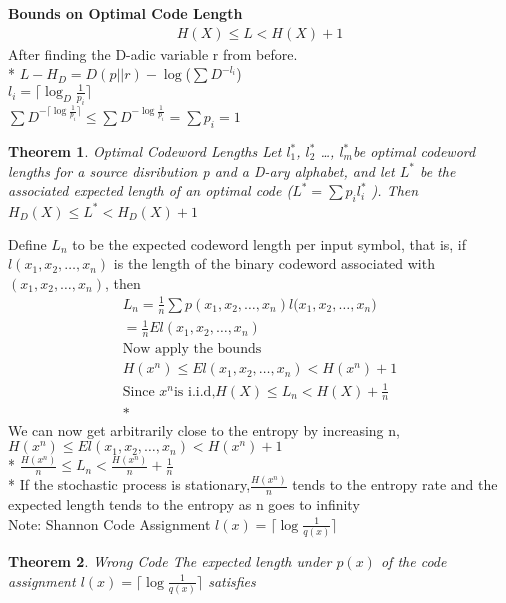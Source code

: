 \documentclass[10pt]{article}
\newtheorem{thm}{Theorem}[section]
\begin{document}
\begin{tiny}
\begin{multicols}{3}
\textbf{\scriptsize Bounds on Optimal Code Length}
\begin{eqnarray*}
H(X) \leq L < H(X) + 1
\end{eqnarray*}
After finding the D-adic variable r from before. \\*
$L-H_D = D(p||r) - \log $($\sum D^{-l_i}$) \\
${l_i} = \lceil{\log_D \frac {1}{p_i}} \rceil$ \\
$\sum D^{- \lceil \log \frac {1}{p_i}\rceil}\leq\sum D^{- \log\frac{1}{p_i}}=\sum {p_i}=1$ 
\begin{thm}{Optimal Codeword Lengths} \label{thm:optimum codewords}
Let ${l_1^{*}}$, ${l_2^{*}}$ \ldots , ${l_m^{*}}$be optimal codeword lengths for a
source disribution p and a D-ary alphabet, and let ${L^{*}}$ be the associated
expected length of an optimal code (${L^{*}}=\sum{p_i}{l_i^{*}}$ ). Then
${H_D(X)}\leq L^{*}<{H_D(X)}+1$ 
\end{thm}
Define ${L_n}$ to be the expected codeword length per input symbol, that is,
if ${l(x_1,x_2, \ldots ,x_n)}$ is the length of the binary codeword associated with
${(x_1,x_2, \ldots ,x_n)}$, then \newline
\begin{eqnarray*}
{L_n} = \frac {1}{n}\sum{p(x_1,x_2, \ldots ,x_n)}{l(x_1,x_2, \ldots ,x_n})\\
= \frac{1}{n}El(x_1,x_2, \ldots ,x_n)\\
\text{Now apply the bounds}\\
{H(x^{n})} \leq El(x_1,x_2, \ldots ,x_n) < {H(x^{n})} + 1 \\
\text{Since } {x^{n}} \text{is i.i.d,} {H(X)} \leq {L_n} < {H(X)} + \frac{1}{n} \\*
\end{eqnarray*}
We can now get arbitrarily close to the entropy by increasing n, \newline
${H(x^{n})} \leq El(x_1,x_2, \ldots ,x_n) < {H(x^{n})} + 1$ \\*
$\frac{H(x^{n})}{n}\leq {L_n}<\frac{H(x^{n})}{n}+\frac{1}{n}$ \\*
If the stochastic process is stationary,$\frac{H(x^{n})}{n}$ tends to the entropy rate \newline
and the expected length tends to the entropy as n goes to infinity \\
Note: Shannon Code Assignment $l(x) = \lceil \log \frac {1}{q(x)} \rceil$
\begin{thm}{Wrong Code} \label{thm:wrongcode}
The expected length under ${p(x)}$ of the code assignment ${l(x)}=\lceil\log\frac{1}{q(x)}\rceil$ satisfies 

\end{thm}
\end{multicols}
\end{tiny}
\end{document}
